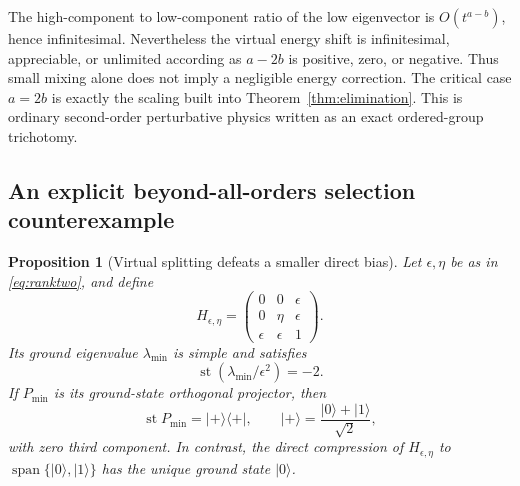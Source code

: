 \documentclass[11pt,oneside]{article}
\numberwithin{equation}{section}
\theoremstyle{plain}
\newtheorem{proposition}[theorem]{Proposition}
\theoremstyle{definition}
\theoremstyle{remark}
\newcommand{\st}{\operatorname{st}}
\newcommand{\Span}{\operatorname{span}}
\newcommand{\ket}[1]{\lvert#1\rangle}
\newcommand{\bra}[1]{\langle#1\rvert}
\newcommand{\proj}[1]{\ket{#1}\!\bra{#1}}
\begin{document}
The high-component to low-component ratio of the low eigenvector is $O(t^{a-b})$, hence infinitesimal. Nevertheless the virtual energy shift is infinitesimal, appreciable, or unlimited according as $a-2b$ is positive, zero, or negative. Thus small mixing alone does not imply a negligible energy correction. The critical case $a=2b$ is exactly the scaling built into Theorem~\ref{thm:elimination}. This is ordinary second-order perturbative physics written as an exact ordered-group trichotomy.

\subsection{An explicit beyond-all-orders selection counterexample}
\begin{proposition}[Virtual splitting defeats a smaller direct bias]\label{prop:virtual}
Let $\epsilon,\eta$ be as in \eqref{eq:ranktwo}, and define
\begin{equation}\label{eq:threelevel}
 H_{\epsilon,\eta}=
 \begin{pmatrix}
 0&0&\epsilon\\
 0&\eta&\epsilon\\
 \epsilon&\epsilon&1
 \end{pmatrix}.
\end{equation}
Its ground eigenvalue $\lambda_{\min}$ is simple and satisfies
\begin{equation}\label{eq:groundenergy}
 \st(\lambda_{\min}/\epsilon^2)=-2.
\end{equation}
If $P_{\min}$ is its ground-state orthogonal projector, then
\begin{equation}\label{eq:groundstate}
 \st P_{\min}=\proj{+},\qquad
 \ket{+}=\frac{\ket{0}+\ket{1}}{\sqrt2},
\end{equation}
with zero third component. In contrast, the direct compression of $H_{\epsilon,\eta}$ to $\Span\{\ket{0},\ket{1}\}$ has the unique ground state $\ket{0}$.
\end{proposition}
\end{document}
